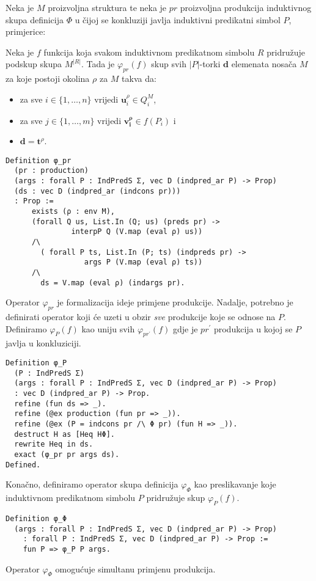 \begin{definition}
  Neka je \(M\) proizvoljna struktura te neka je \(pr\) proizvoljna produkcija induktivnog skupa definicija \(\Phi\)
  u čijoj se konkluziji javlja induktivni predikatni simbol \(P\), primjerice:
  \begin{prooftree}
  \end{prooftree}
\noindent Neka je \(f\) funkcija koja svakom induktivnom predikatnom simbolu \(R\) pridružuje podskup skupa \(M^{|R|}\).
Tada je \(\varphi_{pr}(f)\) skup svih \(|P|\)-torki \(\mathbf{d}\) elemenata nosača \(M\) za koje postoji okolina \(\rho\) za \(M\) takva da:
\begin{itemize}
\item za sve \( i \in \{ 1, \ldots, n \} \) vrijedi \( \mathbf{u}_{i}^{\rho} \in Q_{i}^{M} \), %
\item za sve \( j \in \{ 1, \ldots, m \} \) vrijedi \( \mathbf{v_{i}^{\rho}} \in f(P_{i}) \) i
\item \(\mathbf{d} = \mathbf{t}^{\rho}\).
\end{itemize}
\begin{verbatim}
Definition φ_pr
  (pr : production)
  (args : forall P : IndPredS Σ, vec D (indpred_ar P) -> Prop)
  (ds : vec D (indpred_ar (indcons pr)))
  : Prop :=
      exists (ρ : env M),
      (forall Q us, List.In (Q; us) (preds pr) ->
               interpP Q (V.map (eval ρ) us))
      /\
        ( forall P ts, List.In (P; ts) (indpreds pr) ->
                  args P (V.map (eval ρ) ts))
      /\
        ds = V.map (eval ρ) (indargs pr).
\end{verbatim}
\noindent Operator \(\varphi_{pr}\) je formalizacija ideje primjene produkcije.
Nadalje, potrebno je definirati operator koji će uzeti u obzir \textit{sve} produkcije koje se odnose na \(P\).
Definiramo \(\varphi_{P}(f)\) kao uniju svih \(\varphi_{pr^{\prime}}(f)\) gdje je \(pr^{\prime}\) produkcija u kojoj se \(P\) javlja u konkluziciji.
\begin{verbatim}
Definition φ_P
  (P : IndPredS Σ)
  (args : forall P : IndPredS Σ, vec D (indpred_ar P) -> Prop)
  : vec D (indpred_ar P) -> Prop.
  refine (fun ds => _).
  refine (@ex production (fun pr => _)).
  refine (@ex (P = indcons pr /\ Φ pr) (fun H => _)).
  destruct H as [Heq HΦ].
  rewrite Heq in ds.
  exact (φ_pr pr args ds).
Defined.
\end{verbatim}
\noindent Konačno, definiramo operator skupa definicija \(\varphi_{\Phi}\) kao preslikavanje
koje induktivnom predikatnom simbolu \(P\) pridružuje skup \(\varphi_{P}(f)\).
\begin{verbatim}
Definition φ_Φ
  (args : forall P : IndPredS Σ, vec D (indpred_ar P) -> Prop)
    : forall P : IndPredS Σ, vec D (indpred_ar P) -> Prop :=
    fun P => φ_P P args.
\end{verbatim}
\noindent Operator \(\varphi_{\Phi}\) omogućuje simultanu primjenu produkcija.
\end{definition}

